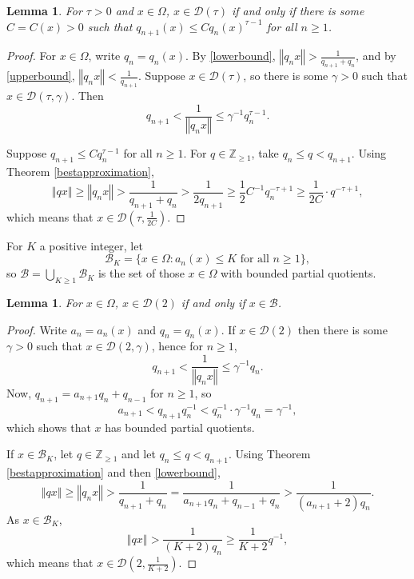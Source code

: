\documentclass{article}
\newcommand{\norm}[1]{\left\Vert #1 \right\Vert}
\newtheorem{lemma}[theorem]{Lemma}
\begin{document}
\begin{lemma}
For $\tau>0$ and $x \in \Omega$, $x \in \mathcal{D}(\tau)$ if and only if there is some
$C=C(x)>0$ such that $q_{n+1}(x) \leq C q_n(x)^{\tau-1}$ for all $n \geq 1$.
\label{Dtau}
\end{lemma}
\begin{proof}
For $x \in \Omega$, write $q_n=q_n(x)$.
By \eqref{lowerbound}, $\norm{q_n x} > \frac{1}{q_{n+1}+q_n}$, 
and by \eqref{upperbound}, $\norm{q_n x} < \frac{1}{q_{n+1}}$.
Suppose $x \in \mathcal{D}(\tau)$, so there is some $\gamma>0$ such that $x \in \mathcal{D}(\tau,\gamma)$. 
Then
\[
q_{n+1} < \frac{1}{\norm{q_n x}} \leq \gamma^{-1} q_n^{\tau-1}.
\]

Suppose $q_{n+1} \leq C q_n^{\tau-1}$ for all $n \geq 1$. For $q \in \mathbb{Z}_{\geq 1}$, take $q_n \leq q < q_{n+1}$.
Using Theorem \ref{bestapproximation},
\[
\norm{qx} \geq \norm{q_n x} > \frac{1}{q_{n+1}+q_n} > \frac{1}{2q_{n+1}} \geq \frac{1}{2} C^{-1} q_n^{-\tau+1}
\geq \frac{1}{2C} \cdot q^{-\tau+1},
\]
which means that $x \in \mathcal{D}(\tau,\frac{1}{2C})$. 
\end{proof}


For $K$ a positive integer, let 
\[
\mathcal{B}_K = \{x \in \Omega: \textrm{$a_n(x) \leq K$ for all $n \geq 1$}\},
\]
so $\mathcal{B}=\bigcup_{K \geq 1} \mathcal{B}_K$ is the set of those $x \in \Omega$ with bounded partial quotients.

\begin{lemma}
For $x \in \Omega$, $x \in \mathcal{D}(2)$ if and only if $x \in \mathcal{B}$.
\end{lemma}
\begin{proof}
Write $a_n=a_n(x)$ and $q_n=q_n(x)$.
If $x \in \mathcal{D}(2)$ then there is some $\gamma>0$ such that $x \in \mathcal{D}(2,\gamma)$, hence for $n \geq 1$,
\[
q_{n+1}<\frac{1}{\norm{q_n x}} \leq \gamma^{-1} q_n.
\]
Now, $q_{n+1} = a_{n+1} q_n + q_{n-1}$ for $n \geq 1$, so
\[
a_{n+1}  < q_{n+1} q_n^{-1}  < q_n^{-1} \cdot \gamma^{-1} q_n
=\gamma^{-1},
\]
which shows that $x$ has bounded partial quotients.

If $x \in \mathcal{B}_K$, let $q \in \mathbb{Z}_{\geq 1}$ and let $q_n \leq q < q_{n+1}$. 
Using Theorem \ref{bestapproximation} and then \eqref{lowerbound},
\[
\norm{qx} \geq \norm{q_n x} > \frac{1}{q_{n+1}+q_n}
=\frac{1}{a_{n+1} q_n + q_{n-1} + q_n}
>\frac{1}{(a_{n+1}+2)q_n}.
\]
As $x \in \mathcal{B}_K$,
\[
\norm{qx} > \frac{1}{(K+2) q_n} \geq \frac{1}{K+2} q^{-1},
\]
which means that $x \in \mathcal{D}(2,\frac{1}{K+2})$. 
\end{proof}
\end{document}

